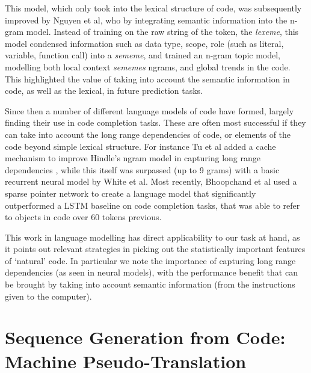 This model, which only took into the lexical structure of code, was subsequently improved by Nguyen et al\cite{nguyen_statistical_2013}, who by integrating semantic information into the n-gram model.
Instead of training on the raw string of the token, the \textit{lexeme}, this model condensed information such as data type, scope, role (such as literal, variable, function call) into a \textit{sememe}, and trained an n-gram topic model, modelling both local context \textit{sememes} ngrams, and global trends in the code.
This highlighted the value of taking into account the semantic information in code, as well as the lexical, in future prediction tasks.

Since then a number of different language models of code have formed, largely finding their use in code completion tasks. These are often most successful if they can take into account the long range dependencies of code, or elements of the code beyond simple lexical structure. For instance Tu et al added a cache mechanism to improve Hindle's ngram model in capturing long range dependencies  \cite{tu_localness_nodate}, while this itself was surpassed (up to 9 grams) with a basic recurrent neural model by White et al\cite{white_toward_2015}.
Most recently, Bhoopchand et al used a sparse pointer network to create a language model that significantly outperformed a LSTM baseline on code completion tasks, that was able to refer to objects in code over 60 tokens previous\cite{bhoopchand_learning_2016}.

This work in language modelling has direct applicability to our task at hand, as it points out relevant strategies in picking out the statistically important features of `natural' code. In particular we note the importance of capturing long range dependencies (as seen in neural models), with the performance benefit that can be brought by taking into account semantic information (from the instructions given to the computer).

\section{Sequence Generation from Code: Machine Pseudo-Translation}

